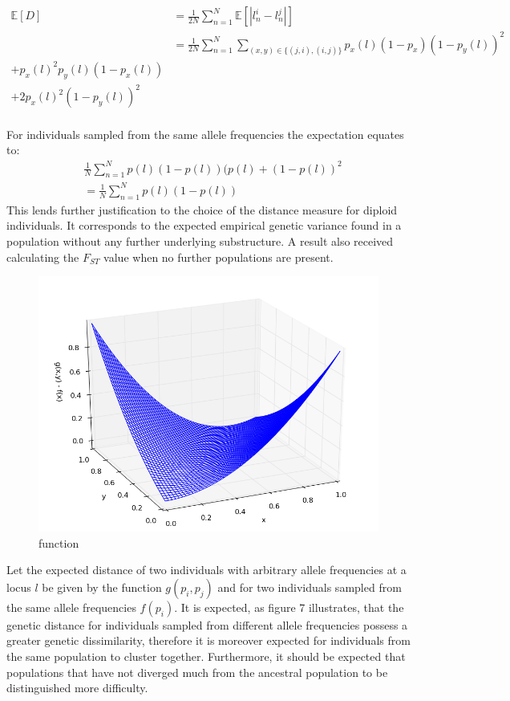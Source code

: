 \documentclass[a4paper, 11pt]{article}
\begin{document}
\begin{align*}
\mathbb{E}[D] &= \frac{1}{2N}\sum^{N}_{n = 1} \mathbb{E}[|l^i_n - l^j_n|] \\
&= \frac{1}{2N} \sum^{N}_{n = 1} \sum_{(x, y) \in \{(j, i), (i, j)\}} p_x(l)(1-p_x)(1-p_y(l))^2 \\
+ p_x(l)^2p_y(l)(1-p_x(l)) \\
+ 2p_x(l)^2(1-p_y(l))^2
\end{align*} \\
For individuals sampled from the same allele frequencies the expectation equates to:
\begin{align*}
& \frac{1}{N} \sum^{N}_{n = 1} p(l)(1-p(l))(p(l)+(1-p(l))^2 \\
&= \frac{1}{N} \sum^{N}_{n = 1} p(l)(1-p(l))
\end{align*}
This lends further justification to the choice of the distance measure for diploid individuals. It corresponds to the expected empirical genetic variance found in a population without any further underlying substructure. A result also received calculating the $F_{ST}$ value when no further populations are present.\\
\begin{figure}
\centering
\includegraphics[scale=0.5]{plot_distance}
\caption{function}
\end{figure}
Let the expected distance of two individuals with arbitrary allele frequencies at a locus $l$ be given by the function $g(p_i, p_j)$ and for two individuals sampled from the same allele frequencies $f(p_i)$. It is expected, as figure 7 illustrates, that the genetic distance for individuals sampled from different allele frequencies possess a greater genetic dissimilarity, therefore it is moreover expected for individuals from the same population to cluster together. Furthermore, it should be expected that populations that have not diverged much from the ancestral population to be distinguished more difficulty.\\
\end{document}
